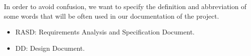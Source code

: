 In order to avoid confusion, we want to specify the definition and abbreviation of some words that will be often used in our documentation of the project. 
\begin{itemize}
    \item RASD: Requirements Analysis and Specification Document.
    \item DD: Design Document.
\end{itemize}